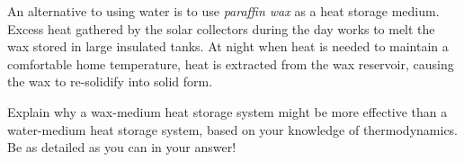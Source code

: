 An alternative to using water is to use {\it paraffin wax} as a heat storage medium.  Excess heat gathered by the solar collectors during the day works to melt the wax stored in large insulated tanks.  At night when heat is needed to maintain a comfortable home temperature, heat is extracted from the wax reservoir, causing the wax to re-solidify into solid form.

\vskip 10pt

Explain why a wax-medium heat storage system might be more effective than a water-medium heat storage system, based on your knowledge of thermodynamics.  Be as detailed as you can in your answer!




